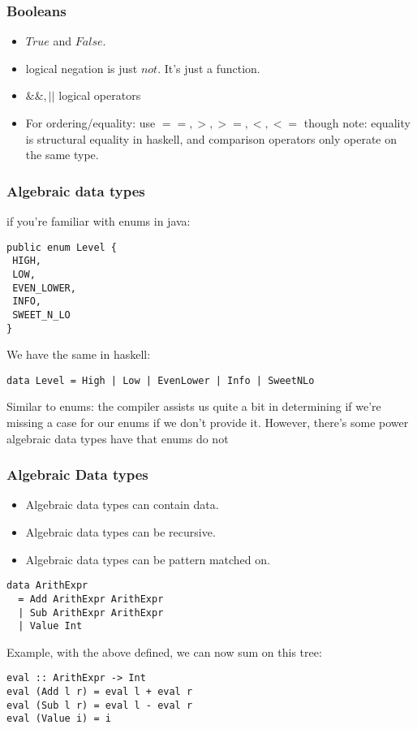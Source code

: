 \documentclass{beamer}
\begin{document}
\begin{frame}[fragile]
\frametitle{Booleans}

\begin{itemize}
\item $True$ and $False$.
\item logical negation is just $not$. It's just a function.
\item $\&\&, ||$ logical operators
\item For ordering/equality: use $==, >, >=, <, <=$ though note: equality is structural equality in haskell, and comparison operators only operate on the same type.
\end{itemize}

\end{frame}

\begin{frame}[fragile]
\frametitle{Algebraic data types}

if you're familiar with enums in java:

\begin{verbatim}
public enum Level {
 HIGH,
 LOW,
 EVEN_LOWER,
 INFO,
 SWEET_N_LO
}
\end{verbatim}

We have the same in haskell:

\begin{verbatim}
data Level = High | Low | EvenLower | Info | SweetNLo
\end{verbatim}

Similar to enums: the compiler assists us quite a bit in determining if we're missing a case for our enums if we don't provide it. However,
 there's some power algebraic data types have that enums do not

\end{frame}


\begin{frame}[fragile]
\frametitle{Algebraic Data types}

\begin{itemize}
\item Algebraic data types can contain data.
\item Algebraic data types can be recursive.
\item Algebraic data types can be pattern matched on.
\end{itemize}

\begin{verbatim}
data ArithExpr 
  = Add ArithExpr ArithExpr
  | Sub ArithExpr ArithExpr 
  | Value Int
\end{verbatim}

Example, with the above defined, we can now sum on this tree:

\begin{verbatim}
eval :: ArithExpr -> Int
eval (Add l r) = eval l + eval r
eval (Sub l r) = eval l - eval r
eval (Value i) = i
\end{verbatim}

\end{frame}
\end{document}
